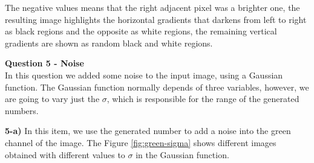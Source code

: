 \documentclass[12pt,a4paper]{article}
\begin{document}
The negative values means that the right adjacent pixel was a brighter one, the resulting image highlights the horizontal gradients that darkens from left to right as black regions and the opposite as white regions, the remaining vertical gradients are shown as random black and white regions.

\newpage

\textbf{Question 5 - Noise} \\

In this question we added some noise to the input image, using a Gaussian function. The Gaussian function normally depends of three variables, however, we are going to vary just the $\sigma$, which is responsible for the range of the generated numbers.

\textbf{5-a) }  In this item, we use the generated number to add a noise into the green channel of the image. The Figure \ref{fig:green-sigma} shows different images obtained with different values to $\sigma$ in the Gaussian function.
\end{document}

